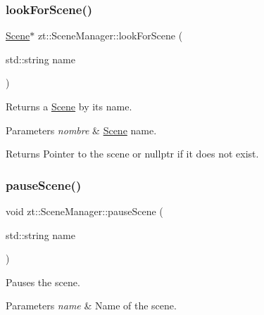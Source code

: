 \subsubsection{\texorpdfstring{look\+For\+Scene()}{lookForScene()}}
{\footnotesize\ttfamily \hyperlink{classzt_1_1_scene}{Scene}$\ast$ zt\+::\+Scene\+Manager\+::look\+For\+Scene (\begin{DoxyParamCaption}\item[{std\+::string}]{name }\end{DoxyParamCaption})\hspace{0.3cm}{\ttfamily [protected]}}

Returns a \hyperlink{classzt_1_1_scene}{Scene} by its name. 
\begin{DoxyParams}{Parameters}
{\em nombre} & \hyperlink{classzt_1_1_scene}{Scene} name. \\
\hline
\end{DoxyParams}
\begin{DoxyReturn}{Returns}
Pointer to the scene or nullptr if it does not exist. 
\end{DoxyReturn}
\mbox{\label{classzt_1_1_scene_manager_ac8864d3586a8fa7ce01a7c5c007dd5e7}} 
\subsubsection{\texorpdfstring{pause\+Scene()}{pauseScene()}}
{\footnotesize\ttfamily void zt\+::\+Scene\+Manager\+::pause\+Scene (\begin{DoxyParamCaption}\item[{std\+::string}]{name }\end{DoxyParamCaption})}



Pauses the scene. 


\begin{DoxyParams}{Parameters}
{\em name} & Name of the scene. \\
\hline
\end{DoxyParams}
\mbox{\label{classzt_1_1_scene_manager_ad6bee2cb8d320e788a2eda8fcdebdbc9}} 
